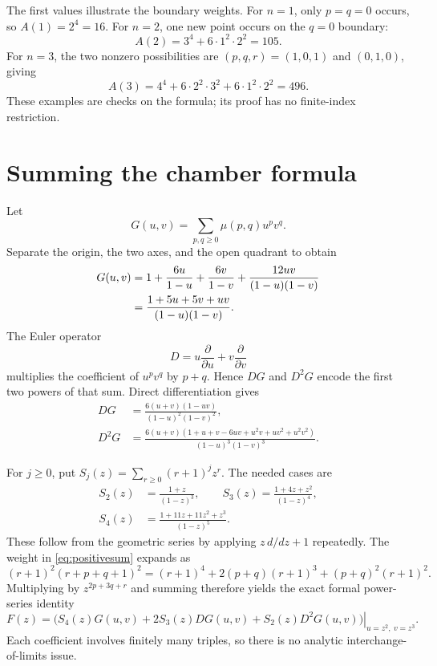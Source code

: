 \documentclass[11pt]{article}
\numberwithin{equation}{section}
\theoremstyle{definition}
\begin{document}
The first values illustrate the boundary weights. For $n=1$, only $p=q=0$
occurs, so $A(1)=2^4=16$. For $n=2$, one new point occurs on the $q=0$
boundary:
\[
 A(2)=3^4+6\cdot1^2\cdot2^2=105.
\]
For $n=3$, the two nonzero possibilities are $(p,q,r)=(1,0,1)$ and
$(0,1,0)$, giving
\[
 A(3)=4^4+6\cdot2^2\cdot3^2+6\cdot1^2\cdot2^2=496.
\]
These examples are checks on the formula; its proof has no finite-index
restriction.

\section{Summing the chamber formula}
\label{sec:GF}

Let
\begin{equation}\label{eq:G}
 G(u,v)=\sum_{p,q\geq0}\mu(p,q)u^pv^q.
\end{equation}
Separate the origin, the two axes, and the open quadrant to obtain
\begin{align}\label{eq:Grational}
 G(u,v)
 &=1+\frac{6u}{1-u}+\frac{6v}{1-v}
       +\frac{12uv}{(1-u)(1-v)}\notag\\
 &=\frac{1+5u+5v+uv}{(1-u)(1-v)}.
\end{align}
The Euler operator
\[
 D=u\frac{\partial}{\partial u}+v\frac{\partial}{\partial v}
\]
multiplies the coefficient of $u^pv^q$ by $p+q$. Hence $DG$ and $D^2G$
encode the first two powers of that sum. Direct differentiation gives
\begin{align}
 DG&=\frac{6(u+v)(1-uv)}{(1-u)^2(1-v)^2},\label{eq:DG}\\
 D^2G&=\frac{6(u+v)(1+u+v-6uv+u^2v+uv^2+u^2v^2)}
 {(1-u)^3(1-v)^3}.\label{eq:D2G}
\end{align}

For $j\geq0$, put $S_j(z)=\sum_{r\geq0}(r+1)^jz^r$. The needed cases are
\begin{equation}\label{eq:S}
\begin{split}
 S_2(z)&=\frac{1+z}{(1-z)^3},\qquad
 S_3(z)=\frac{1+4z+z^2}{(1-z)^4},\\
 S_4(z)&=\frac{1+11z+11z^2+z^3}{(1-z)^5}.
\end{split}
\end{equation}
These follow from the geometric series by applying $z\,d/dz+1$ repeatedly.
The weight in \eqref{eq:positivesum} expands as
\[
 (r+1)^2(r+p+q+1)^2
 =(r+1)^4+2(p+q)(r+1)^3+(p+q)^2(r+1)^2.
\]
Multiplying by $z^{2p+3q+r}$ and summing therefore yields the exact formal
power-series identity
\begin{equation}\label{eq:GFoperator}
 F(z)=\left.
 \bigl(S_4(z)G(u,v)+2S_3(z)DG(u,v)+S_2(z)D^2G(u,v)\bigr)
 \right|_{u=z^2,\ v=z^3}.
\end{equation}
Each coefficient involves finitely many triples, so there is no analytic
interchange-of-limits issue.
\end{document}
